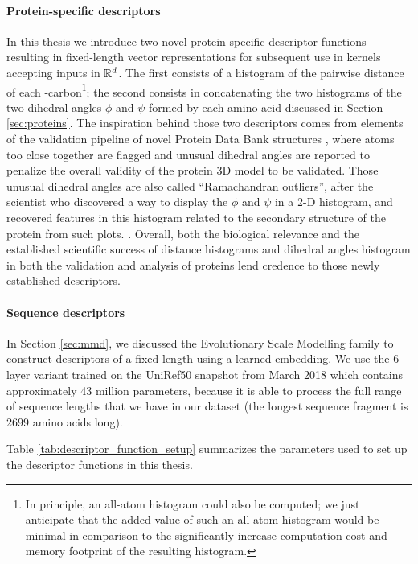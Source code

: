 \paragraph{Protein-specific descriptors} In this thesis we introduce two novel
protein-specific descriptor functions resulting in fixed-length vector
representations for subsequent use in kernels accepting inputs in $\mathbb{R}^d$. The
first consists of a histogram of the pairwise distance of each
\textalpha{}-carbon\footnote{In principle, an all-atom histogram could also be
computed; we just anticipate that the added value of such an all-atom histogram
would be minimal in comparison to the significantly increase computation cost
and memory footprint of the resulting histogram.}; the second consists in
concatenating the two histograms of the two dihedral angles $\phi$ and $\psi$
formed by each amino acid discussed in Section \ref{sec:proteins}. The
inspiration behind those two descriptors comes from elements of the validation
pipeline of novel Protein Data Bank structures \citep{read2011new,
gore2012implementing, gore2017validation}, where atoms too close together are
flagged and unusual dihedral angles are reported to penalize the overall
validity of the protein 3D model to be validated. Those unusual dihedral angles
are also called ``Ramachandran outliers'', after the scientist who discovered a
way to display the $\phi$ and $\psi$ in a 2-D histogram, and recovered features
in this histogram related to the secondary structure of the protein from such
plots. \citep{ramachandran1063Stereochemistry}. Overall, both the biological
relevance and the established scientific success of distance histograms and
dihedral angles histogram in both the validation and analysis of proteins lend
credence to those newly established descriptors.


\paragraph{Sequence descriptors} In Section \ref{sec:mmd}, we discussed the
Evolutionary Scale Modelling family to construct descriptors of a fixed length
using a learned embedding. We use the 6-layer variant trained on
the UniRef50 snapshot from March 2018 which contains approximately 43 million
parameters, because it is able to process the full range of sequence lengths
that we have in our dataset (the longest sequence fragment is 2699 amino acids long).

Table \ref{tab:descriptor_function_setup} summarizes the parameters used to set
up the descriptor functions in this thesis.

